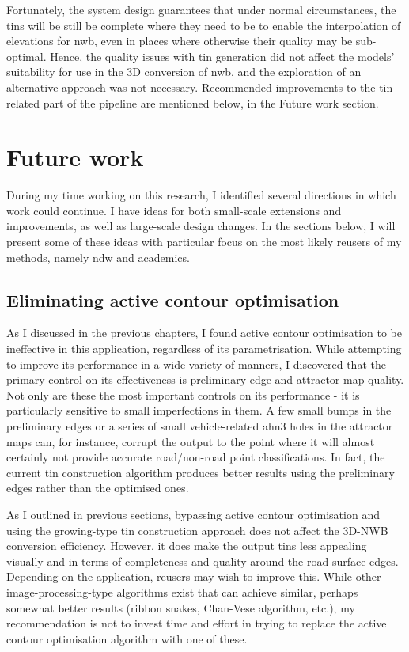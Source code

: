 Fortunately, the system design guarantees that under normal circumstances, the \ac{tin}s will be still be complete where they need to be to enable the interpolation of elevations for \ac{nwb}, even in places where otherwise their quality may be sub-optimal. Hence, the quality issues with \ac{tin} generation did not affect the models' suitability for use in the 3D conversion of \ac{nwb}, and the exploration of an alternative approach was not necessary. Recommended improvements to the \ac{tin}-related part of the pipeline are mentioned below, in the Future work section.

\section{Future work}
\label{sec:futurework}

During my time working on this research, I identified several directions in which work could continue. I have ideas for both small-scale extensions and improvements, as well as large-scale design changes. In the sections below, I will present some of these ideas with particular focus on the most likely reusers of my methods, namely \ac{ndw} and academics.

\subsection{Eliminating active contour optimisation}
\label{sub:improvementsactivecontours}

As I discussed in the previous chapters, I found active contour optimisation to be ineffective in this application, regardless of its parametrisation. While attempting to improve its performance in a wide variety of manners, I discovered that the primary control on its effectiveness is preliminary edge and attractor map quality. Not only are these the most important controls on its performance - it is particularly sensitive to small imperfections in them. A few small bumps in the preliminary edges or a series of small vehicle-related \ac{ahn3} holes in the attractor maps can, for instance, corrupt the output to the point where it will almost certainly not provide accurate road/non-road point classifications. In fact, the current \ac{tin} construction algorithm produces better results using the preliminary edges rather than the optimised ones.

As I outlined in previous sections, bypassing active contour optimisation and using the growing-type \ac{tin} construction approach does not affect the 3D-NWB conversion efficiency. However, it does make the output \ac{tin}s less appealing visually and in terms of completeness and quality around the road surface edges. Depending on the application, reusers may wish to improve this. While other image-processing-type algorithms exist that can achieve similar, perhaps somewhat better results (ribbon snakes, Chan-Vese algorithm, etc.), my recommendation is not to invest time and effort in trying to replace the active contour optimisation algorithm with one of these.

